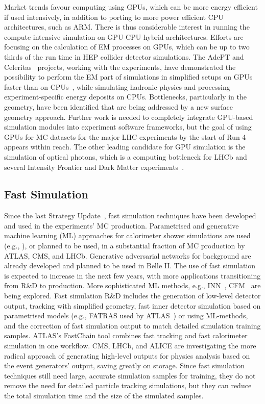 \documentclass[10pt,a4paper]{article}
\begin{document}
Market trends favour computing using GPUs, which can be more energy efficient if
used intensively, in addition to porting to more power efficient CPU
architectures, such as ARM. There is thus considerable interest in running the
compute intensive simulation on GPU-CPU hybrid architectures. Efforts are
focusing on the calculation of EM processes on GPUs, which can be up to two
thirds of the run time in HEP collider detector simulations. The AdePT
\cite{Amadio_2023, AdePT} and Celeritas~\cite{osti_2361202} projects, working with the
experiments, have demonstrated the possibility to perform the EM part of
simulations in simplified setups on GPUs faster than on
CPUs~\cite{CHEP2024:celeritas_improvements, CHEP2024:adept_gpu_em_transport},
while simulating hadronic physics and
processing experiment-specific energy deposits on CPUs. Bottlenecks,
particularly in the geometry, have been identified that are being addressed by a
new surface geometry approach. Further work is needed to completely integrate GPU-based
simulation modules into experiment software frameworks, but the goal of using
GPUs for MC datasets for the major LHC experiments by the start of Run 4 appears
within reach. The other leading candidate for GPU simulation is the simulation
of optical photons, which is a computing bottleneck for LHCb and several
Intensity Frontier and Dark Matter experiments~\cite{opticksCHEP}.

\subsection{Fast Simulation}\label{fast-simulation}

Since the last Strategy Update~\cite{European:2720131}, fast simulation
techniques have been developed and used in the experiments' MC
production. Parametrised and generative machine learning (ML) approaches for
calorimeter shower simulations are used (e.g., \cite{af3}), or planned to be
used, in a substantial fraction of MC production by ATLAS, CMS, and
LHCb. Generative adversarial networks for background are
already developed and planned to be used in Belle II. The use of fast simulation
is expected to increase in the next few years,
with more applications transitioning from R\&D to production. More sophisticated
ML methods, e.g., INN~\cite{kim2021innmethodidentifyingcleanannotated},
CFM~\cite{tong2024improvinggeneralizingflowbasedgenerative} are being explored.
Fast simulation R\&D includes the generation of low-level detector output,
tracking with simplified geometry, fast inner detector simulation based on
parametrised models (e.g., FATRAS used by ATLAS~\cite{fatras}) or using
ML-methods, and the correction of fast simulation output to match detailed
simulation training samples. ATLAS's FastChain tool combines fast tracking and
fast calorimeter simulation in one workflow. CMS, LHCb, and ALICE are
investigating the more radical approach of generating high-level outputs for
physics analysis based on the event generators' output, saving greatly on
storage. Since fast simulation techniques still need large, accurate simulation
samples for training, they do not remove the need for detailed particle tracking
simulations, but they can reduce the total simulation time and the size of the
simulated samples.
\end{document}
